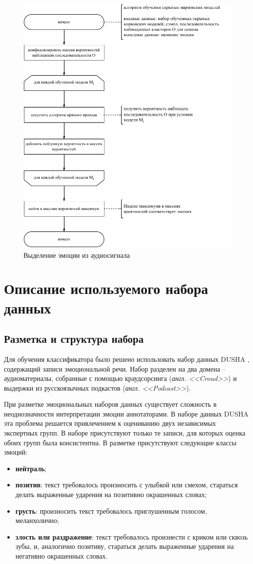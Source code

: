 \begin{figure}[H]
	\centering
	\includegraphics[width=0.7\linewidth]{assets/hmm-test}
	\caption{Выделение эмоции из аудиосигнала}
	\label{fig:hmm-test}
\end{figure}

\section{Описание используемого набора данных}
\subsection{Разметка и структура набора}
Для обучения классификатора было решено использовать набор данных DUSHA \cite{dusha}, содержащий записи эмоциональной речи. Набор разделен на два домена -- аудиоматериалы, собранные с помощью краудсорсинга (\textit{англ. <<Croud>>}) и выдержки из русскоязычных подкастов (\textit{англ. <<Podcast>>}). 

При разметке эмоциональных наборов данных существует сложность в неоднозначности интерпретации эмоции аннотаторами. В наборе данных DUSHA эта проблема решается привлечением к оцениванию двух независимых экспертных групп. В наборе присутствуют только те записи, для которых оценка обоих групп была консистентна. В разметке присутствуют следующие классы эмоций: 
\begin{itemize}
	\item \textbf{нейтраль};
	\item \textbf{позитив}: текст требовалось произносить с улыбкой или смехом, стараться делать выраженные ударения на позитивно окрашенных словах;
	\item \textbf{грусть}: произносить текст требовалось приглушенным голосом, меланхолично;
	\item \textbf{злость или раздражение}: текст требовалось произнести с криком или сквозь зубы, и, аналогично позитиву, стараться делать выраженные ударения на негативно окрашенных словах.
\end{itemize}


